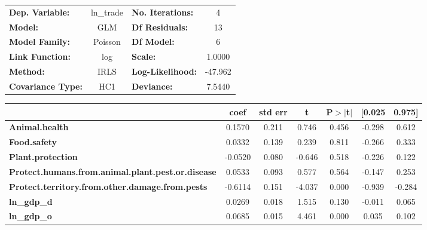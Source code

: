 \begin{center}
\begin{tabular}{lclc}
\toprule
\textbf{Dep. Variable:}                                   &   ln\_trade   & \textbf{  No. Iterations:    } &     4       \\
\textbf{Model:}                                           &      GLM      & \textbf{  Df Residuals:      } &     13      \\
\textbf{Model Family:}                                    &    Poisson    & \textbf{  Df Model:          } &     6       \\
\textbf{Link Function:}                                   &      log      & \textbf{  Scale:             } &    1.0000   \\
\textbf{Method:}                                          &      IRLS     & \textbf{  Log-Likelihood:    } &   -47.962   \\
\textbf{Covariance Type:}                                 &      HC1      & \textbf{  Deviance:          } &    7.5440   \\
\bottomrule
\end{tabular}
\begin{tabular}{lcccccc}
                                                          & \textbf{coef} & \textbf{std err} & \textbf{t} & \textbf{P$> |$t$|$} & \textbf{[0.025} & \textbf{0.975]}  \\
\midrule
\textbf{Animal.health}                                    &       0.1570  &        0.211     &     0.746  &         0.456        &       -0.298    &        0.612     \\
\textbf{Food.safety}                                      &       0.0332  &        0.139     &     0.239  &         0.811        &       -0.266    &        0.333     \\
\textbf{Plant.protection}                                 &      -0.0520  &        0.080     &    -0.646  &         0.518        &       -0.226    &        0.122     \\
\textbf{Protect.humans.from.animal.plant.pest.or.disease} &       0.0533  &        0.093     &     0.577  &         0.564        &       -0.147    &        0.253     \\
\textbf{Protect.territory.from.other.damage.from.pests}   &      -0.6114  &        0.151     &    -4.037  &         0.000        &       -0.939    &       -0.284     \\
\textbf{ln\_gdp\_d}                                       &       0.0269  &        0.018     &     1.515  &         0.130        &       -0.011    &        0.065     \\
\textbf{ln\_gdp\_o}                                       &       0.0685  &        0.015     &     4.461  &         0.000        &        0.035    &        0.102     \\
\bottomrule
\end{tabular}
\end{center}